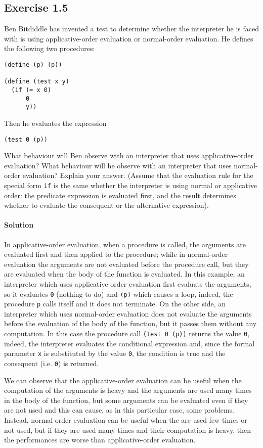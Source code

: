 \subsection*{Exercise 1.5}
Ben Bitdiddle has invented a test to determine whether the interpreter he is faced with is using applicative-order evaluation 
or normal-order evaluation. He defines the following two procedures:

\begin{lstlisting}
(define (p) (p))

(define (test x y)
  (if (= x 0)
      0
      y))
\end{lstlisting}

Then he evaluates the expression

\begin{lstlisting}
(test 0 (p))
\end{lstlisting}

What behaviour will Ben observe with an interpreter that uses applicative-order evaluation? What behaviour will he
observe with an interpreter that uses normal-order evaluation? Explain your answer. (Assume that the evaluation
rule for the special form \texttt{if} is the same whether the interpreter is using normal or applicative order: the predicate 
expression is evaluated first, and the result determines whether to evaluate the consequent or the alternative expression).

\paragraph{Solution}
In applicative-order evaluation, when a procedure is called, the arguments are evaluated first and then applied to the
procedure; while in normal-order evaluation the arguments are not evaluated before the procedure call, but they are evaluated
when the body of the function is evaluated.
In this example, an interpreter which uses applicative-order evaluation first evaluats the arguments, so it evaluates \texttt{0} 
(nothing to do) and \texttt{(p)} which causes a loop, indeed, the procedure \texttt{p} calls itself and it does not terminate.
On the other side, an interpreter which uses normal-order evaluation does not evaluate the arguments before the evaluation of
the body of the function, but it passes them without any computation. In this case the procedure call \texttt{(test 0 (p))}
returns the value \texttt{0}, indeed, the interpreter evaluates the conditional expression and, since the formal parameter \texttt{x}
is substituted by the value \texttt{0}, the condition is true and the consequent (i.e. \texttt{0}) is returned.

We can observe that the applicative-order evaluation can be useful when the computation of the arguments is heavy and the arguments are
used many times in the body of the function, but some arguments can be evaluated even if they are not used and this can cause,
as in this particular case, some problems.
Instead, normal-order evaluation can be useful when the are used few times or not used, but if they are used many times and their
computation is heavy, then the performances are worse than applicative-order evaluation.